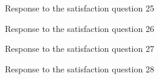 \documentclass[12pt,oneside,openright,a4paper]{cpe-english-project}
\begin{document}
\begin{figure}[!h]\centering {} \caption{Response to the satisfaction question 25} \end{figure}
\begin{figure}[!h]\centering {} \caption{Response to the satisfaction question 26} \end{figure}
\begin{figure}[!h]\centering {} \caption{Response to the satisfaction question 27} \end{figure}
\begin{figure}[!h]\centering {} \caption{Response to the satisfaction question 28} \end{figure}
\end{document}
